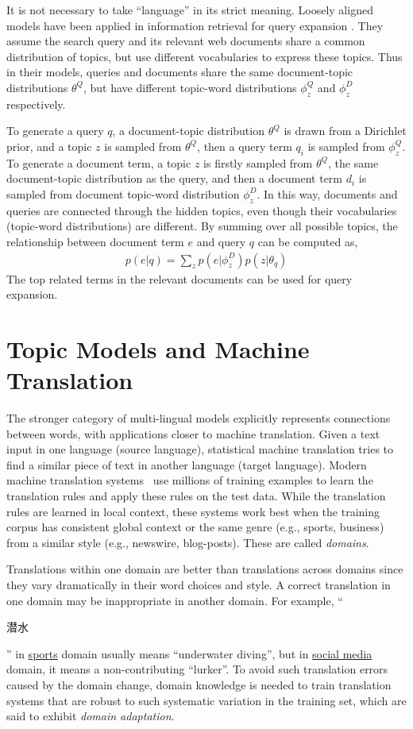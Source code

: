It is not necessary to take ``language'' in its strict meaning.
Loosely aligned models have been applied in information retrieval for query expansion \citep{Gao-2011,Gao-2012}. They assume the search
query and its relevant web documents share a common distribution of
topics, but use different vocabularies to express these topics. Thus
in their models, queries and documents share the same document-topic
distributions $\theta^Q$, but have different topic-word distributions
$\phi_z^Q$ and $\phi_z^D$ respectively.

To generate a query $q$, a document-topic distribution $\theta^Q$ is
drawn from a Dirichlet prior, and a topic $z$ is sampled from
$\theta^Q$, then a query term $q_i$ is sampled from $\phi_z^Q$. To
generate a document term, a topic $z$ is firstly sampled from
$\theta^Q$, the same document-topic distribution as the query, and
then a document term $d_i$ is sampled from document topic-word
distribution $\phi_z^D$. In this way, documents and queries are
connected through the hidden topics, even though their vocabularies
(topic-word distributions) are different. By summing over all possible
topics, the relationship between document term $e$ and query $q$ can
be computed as,
\begin{align}
p(e|q) = \sum_z p(e|\phi_z^D) p(z | \theta_q)
\end{align}
The top related terms in the relevant documents can be used for query expansion. 

\section{Topic Models and Machine Translation}

The stronger category of multi-lingual models explicitly represents connections between words, with applications closer to machine translation.
Given a text input in one language (source language), statistical
machine translation tries to find a similar piece of text in another
language (target language). Modern machine translation
systems~\citep{koehn-09} use millions of training examples to learn
the translation rules and apply these rules on the test data. While
the translation rules are learned in local context, these systems work
best when the training corpus has consistent global context or the
same genre (e.g., sports, business) from a similar style (e.g.,
newswire, blog-posts).  These are called \emph{domains}.

Translations within one domain are better than translations across
domains since they vary dramatically in their word choices and style.
A correct translation in one domain may be inappropriate in another
domain.  For example, ``\begin{CJK*}{UTF8}{gbsn}潜水\end{CJK*}'' in
  \underline{sports} domain usually means ``underwater diving'', but
  in \underline{social media} domain, it means a non-contributing
  ``lurker''. To avoid such translation errors caused by the domain
  change, domain knowledge is needed to train translation systems that
  are robust to such systematic variation in the training set, which
  are said to exhibit \emph{domain adaptation}.

